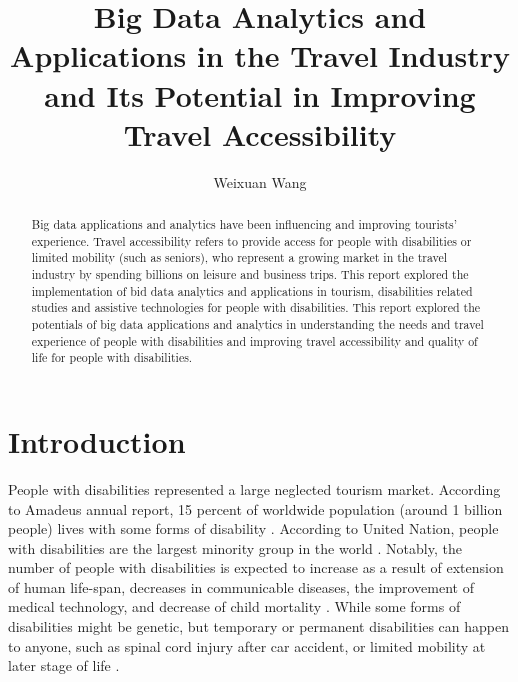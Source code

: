 \title{Big Data Analytics and Applications in the Travel Industry and Its Potential in Improving Travel Accessibility}


\author{Weixuan Wang}
 

\renewcommand{\shortauthors}{Weixuan Wang}


\begin{abstract}
Big data applications and analytics have been influencing and improving 
tourists' experience. Travel accessibility refers to provide access for 
people with disabilities or limited mobility (such as seniors), who represent
a growing market in the travel industry by spending billions on leisure and 
business trips. This report explored the implementation of bid data analytics
and applications in tourism, disabilities related studies and assistive technologies
for people with disabilities. This report explored the potentials of big data applications
and analytics in understanding the needs and travel experience of people with disabilities
and improving travel accessibility and quality of life for people with disabilities.
\end{abstract}



\maketitle



\section{Introduction}
People with disabilities represented a large neglected tourism market. According to
Amadeus annual report, 15 percent of worldwide population (around 1 billion people) lives
with some forms of disability \cite{Ama}. According to United Nation, people with 
disabilities are the largest minority group in the world
\cite{Appleyard2005,DARCY2010816,Lex}. Notably, the number of people with disabilities is
expected to increase as a  result of extension of human life-span, decreases in
communicable diseases, the improvement of medical technology, and decrease of child
mortality \cite{SMITH1987376}.  While some forms of disabilities might be genetic, but
temporary or permanent disabilities can happen to anyone, such 
as spinal cord injury after car accident, or limited mobility at later stage of life
\cite{Lex}. 

